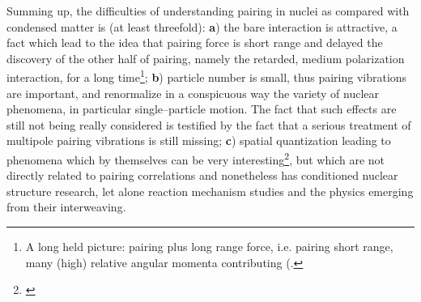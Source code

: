 \begin{subappendices}
    Summing up, the difficulties of understanding pairing in nuclei as compared with condensed matter is (at least threefold): \textbf{a}) the bare interaction is attractive, a fact which lead to the idea that pairing force is short range and delayed the discovery of the other half of pairing, namely the retarded, medium polarization interaction, for a long time\footnote{A long held picture: pairing plus long range force, i.e. pairing short range, many (high) relative angular momenta contributing (\cite{Kisslinger:63,Soloviev:65,Mottelson:62,Mottelson:02}.}; \textbf{b}) particle number is small, thus pairing vibrations are important, and renormalize in a conspicuous way the variety of nuclear phenomena, in particular single--particle motion. The fact that such effects are still not being really considered is testified by the fact that a serious treatment of multipole pairing vibrations is still missing; \textbf{c}) spatial quantization leading to phenomena which by themselves can be very interesting\footnote{\cite{Bertsch:67,Ferreira:84,Lotti:89,Matsuo:06,Matsuo:13}}, but which are not directly related to pairing correlations and nonetheless has conditioned nuclear structure research, let alone reaction mechanism studies and the physics emerging from their interweaving.

\end{subappendices}
